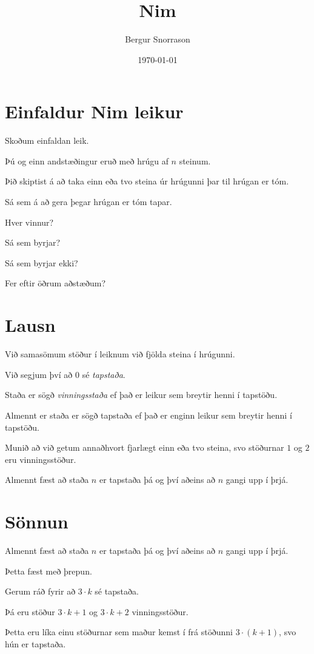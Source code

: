 \title{Nim}
\author{Bergur Snorrason}
\date{\today}



\frame{\titlepage}

\section{Einfaldur Nim leikur}
{
    {
        \item<1-> Skoðum einfaldan leik.
        \item<2-> Þú og einn andstæðingur eruð með hrúgu af $n$ steinum.
        \item<3-> Þið skiptist á að taka einn eða tvo steina úr hrúgunni þar til hrúgan er tóm.
        \item<4-> Sá sem á að gera þegar hrúgan er tóm tapar.
        \item<5-> Hver vinnur?
        {
            \item<5-> Sá sem byrjar?
            \item<5-> Sá sem byrjar ekki?
            \item<5-> Fer eftir öðrum aðstæðum?
        }
    }
}

\section{Lausn}
{
    {
        \item<1-> Við samasömum stöður í leiknum við fjölda steina í hrúgunni.
        \item<2-> Við segjum því að $0$ sé \emph{tapstaða}.
        \item<3-> Staða er sögð \emph{vinningsstaða} ef það er leikur sem breytir henni í tapstöðu.
        \item<4-> Almennt er staða er sögð tapstaða ef það er enginn leikur sem breytir henni í tapstöðu.
        \item<5-> Munið að við getum annaðhvort fjarlægt einn eða tvo steina, svo stöðurnar $1$ og $2$ eru vinningsstöður.
        \item<6-> Almennt fæst að staða $n$ er tapstaða þá og því aðeins að $n$ gangi upp í þrjá.
    }
}

\section{Sönnun}
{
    {
        \item<1-> Almennt fæst að staða $n$ er tapstaða þá og því aðeins að $n$ gangi upp í þrjá.
        \item<2-> Þetta fæst með þrepun.
        \item<3-> Gerum ráð fyrir að $3 \cdot k$ sé tapstaða.
        \item<4-> Þá eru stöður $3 \cdot k + 1$ og $3 \cdot k + 2$ vinningsstöður.
        \item<5-> Þetta eru líka einu stöðurnar sem maður kemst í frá stöðunni $3 \cdot (k + 1)$, svo hún er tapstaða.
    }
}

